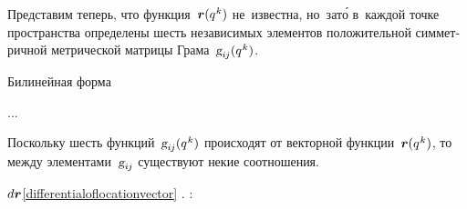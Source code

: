 \begin{otherlanguage}{russian}

Представим теперь, что функция~${\bm{r}(q^{\hspace{.1ex}k})}$ не~известна, но~\hbox{зат\'{о}} в~каждой точке пространства определены шесть независимых элементов положительной симметричной метрической матрицы Грама~${\textsl{g}_{i\hspace{-0.1ex}j}(q^{\hspace{.1ex}k})}$.

Билинейная форма

\nopagebreak ...

Поскольку шесть функций~${\textsl{g}_{i\hspace{-0.1ex}j}(q^{\hspace{.1ex}k})}$ происходят от векторной функции~${\bm{r}(q^{\hspace{.1ex}k})}$, то между элементами~$\textsl{g}_{i\hspace{-0.1ex}j}$ существуют некие соотношения.

 ${d\bm{r}}$\;\eqref{differentialoflocationvector}\ru{\:---} .
   :


\end{otherlanguage}
